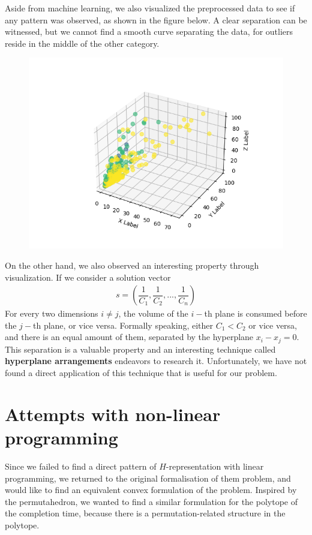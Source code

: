 \documentclass[12pt,letterpaper]{article}
\begin{document}
Aside from machine learning, we also visualized the preprocessed data to see 
if any pattern was observed, as shown in the figure below. 
A clear separation can be witnessed, but we cannot find a smooth curve separating the data, for outliers reside 
in the middle of the other category. 
\begin{figure}[ht]
    \centering
    \includegraphics[scale=0.6]{3d_plot.png}
\end{figure}
On the other hand, we also observed an interesting property through visualization. If we consider a solution vector 
\begin{align*}
 s = \left( \dfrac{1}{C_1}, \dfrac{1}{C_2}, ..., \dfrac{1}{C_n} \right)
\end{align*}
For every two dimensions $ i \neq j$, the volume of the $i-$th plane is consumed before the $j-$th plane, or vice versa.
Formally speaking, either $C_1 < C_2$ or vice versa, and there is an equal amount of them, separated by the hyperplane 
$x_i - x_j = 0$. This separation is a valuable property and an interesting technique called \textbf{hyperplane arrangements} 
endeavors to research it. Unfortunately, we have not found a direct application of this technique that is useful for our problem.


\section{Attempts with non-linear programming}
Since we failed to find a direct pattern of $H$-representation with linear programming, 
we returned to the original formalisation of them problem, and would like to 
find an equivalent convex formulation of the problem.
Inspired by the permutahedron, we wanted to find a similar formulation for the polytope of the completion time,
because there is a permutation-related structure in the polytope. 
\end{document}
